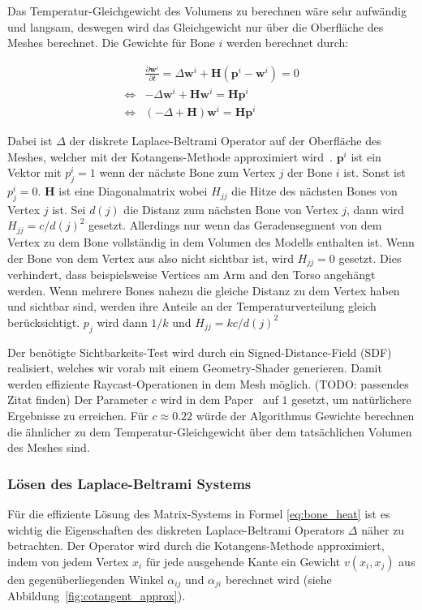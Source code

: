 Das Temperatur-Gleichgewicht des Volumens zu berechnen wäre sehr aufwändig und langsam, deswegen wird das Gleichgewicht nur über die Oberfläche des Meshes berechnet. Die Gewichte für Bone $i$ werden berechnet durch:

\begin{equation}
    \label{eq:bone_heat}
    \begin{aligned}
        &\frac{\partial\mathbf{w}^i}{\partial t} = \Delta\mathbf{w}^i+\mathbf{H}\left(\mathbf{p}^i-\mathbf{w}^i\right)=0 \\
        \iff &-\Delta\mathbf{w}^i+\mathbf{H}\mathbf{w}^i=\mathbf{H}\mathbf{p}^i \\
        \iff &\left(-\Delta+\mathbf{H}\right)\mathbf{w}^i=\mathbf{H}\mathbf{p}^i
    \end{aligned}
\end{equation}

Dabei ist $\Delta$ der diskrete Laplace-Beltrami Operator auf der Oberfläche des Meshes, welcher mit der Kotangens-Methode approximiert wird~\cite{laplace_beltrami_paper}. $\mathbf{p}^i$ ist ein Vektor mit $p^i_j=1$ wenn der nächste Bone zum Vertex $j$ der Bone $i$ ist. Sonst ist $p^i_j=0$. $\mathbf{H}$ ist eine Diagonalmatrix wobei $H_{jj}$ die Hitze des nächsten Bones von Vertex $j$ ist. Sei $d(j)$ die Distanz zum nächsten Bone von Vertex $j$, dann wird $H_{jj}=c/d(j)^2$ gesetzt. Allerdings nur wenn das Geradensegment von dem Vertex zu dem Bone vollständig in dem Volumen des Modells enthalten ist. Wenn der Bone von dem Vertex aus also nicht sichtbar ist, wird $H_{jj}=0$ gesetzt. Dies verhindert, dass beispielsweise Vertices am Arm and den Torso angehängt werden. Wenn mehrere Bones nahezu die gleiche Distanz zu dem Vertex haben und sichtbar sind, werden ihre Anteile an der Temperaturverteilung gleich berücksichtigt. $p_j$ wird dann $1/k$ und $H_{jj} = kc/d(j)^2$

Der benötigte Sichtbarkeits-Test wird durch ein Signed-Distance-Field (SDF) realisiert, welches wir vorab mit einem Geometry-Shader generieren. Damit werden effiziente Raycast-Operationen in dem Mesh möglich. (TODO: passendes Zitat finden)
Der Parameter $c$ wird in dem Paper~\cite{bone_heat_paper} auf $1$ gesetzt, um natürlichere Ergebnisse zu erreichen. Für $c\approx0.22$ würde der Algorithmus Gewichte berechnen die ähnlicher zu dem Temperatur-Gleichgewicht über dem tatsächlichen Volumen des Meshes sind.

\subsubsection{Lösen des Laplace-Beltrami Systems}
Für die effiziente Lösung des Matrix-Systems in Formel \ref{eq:bone_heat} ist es wichtig die Eigenschaften des diskreten Laplace-Beltrami Operators $\Delta$ näher zu betrachten. Der Operator wird durch die Kotangens-Methode approximiert, indem von jedem Vertex $x_i$ für jede ausgehende Kante ein Gewicht $v(x_i,x_j)$ aus den gegenüberliegenden Winkel $\alpha_{ij}$ und $\alpha_{ji}$ berechnet wird (siehe Abbildung~\ref{fig:cotangent_approx}).

